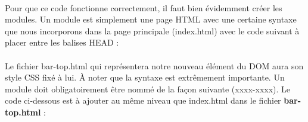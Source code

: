 \documentclass{article}
\begin{document}
\vspace{0.5cm}\\
Pour que ce code fonctionne correctement, il faut bien \'evidemment cr\'eer les modules. Un module est simplement une page HTML avec une certaine syntaxe que nous incorporons dans la page principale (index.html) avec le code suivant \`a placer entre les balises HEAD :
\vspace{0.5cm}\\
\vspace{0.5cm}\\

Le fichier bar-top.html qui repr\'esentera notre nouveau \'el\'ement du DOM aura son style CSS fix\'e \`a lui. \`A noter que la syntaxe est extr\^emement importante. Un module doit obligatoirement \^etre nomm\'e de la fa\c{c}on suivante (xxxx-xxxx). Le code ci-dessous est \`a ajouter au m\^eme niveau que index.html dans le fichier \textbf{bar-top.html} :
\vspace{0.5cm}\\
\end{document}
